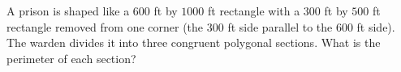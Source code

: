 A prison is shaped like a $600$ ft by $1000$ ft rectangle with a $300$ ft by $500$ ft rectangle removed from one corner (the $300$ ft side parallel to the $600$ ft side). The warden divides it into three congruent polygonal sections. What is the perimeter of each section?
